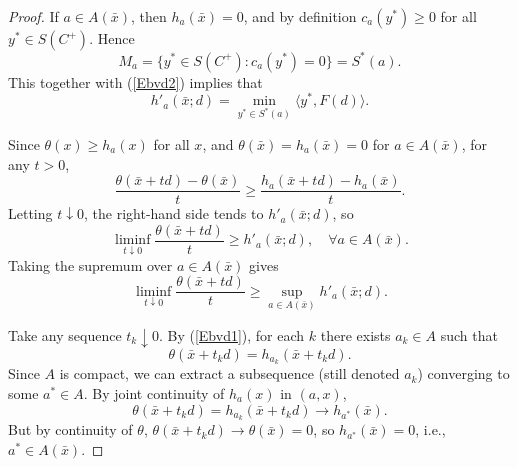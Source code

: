 \documentclass[11pt]{article}
\begin{document}
\begin{proof}
If $a\in A(\bar x)$, then $h_a(\bar x)=0$, and by definition $c_a(y^*)\ge0$ for all $y^*\in S(C^+)$. Hence
\[
M_a=\{y^*\in S(C^+):c_a(y^*)=0\}=S^*(a).
\]
This together with  (\ref{Ebvd2})  implies that 
\begin{equation}\label{Ebvd3}
h'_a(\bar x;d)=\min_{y^*\in S^*(a)}\langle y^*,F(d)\rangle. 
 \end{equation}
	
Since $\theta(x)\ge h_a(x)$ for all $x$, and $\theta(\bar x)=h_a(\bar x)=0$ for $a\in A(\bar x)$, for any $t>0$,
	\[
	\frac{\theta(\bar x+td)-\theta(\bar x)}{t}
	\ge\frac{h_a(\bar x+td)-h_a(\bar x)}{t}.
	\]
	Letting $t\downarrow0$, the right-hand side tends to $h'_a(\bar x;d)$, so
	\[
	\liminf_{t\downarrow0}\frac{\theta(\bar x+td)}{t}\ge h'_a(\bar x;d),\quad\forall a\in A(\bar x).
	\]
	Taking the supremum over $a\in A(\bar x)$ gives
\begin{equation}\label{Ebvd4}
	\liminf_{t\downarrow0}\frac{\theta(\bar x+td)}{t}\ge\sup_{a\in A(\bar x)}h'_a(\bar x;d) .  
\end{equation}

		Take any sequence $t_k\downarrow0$. By (\ref{Ebvd1}), for each $k$ there exists $a_k\in A$ such that
\begin{equation}\label{Ebvd5}	
	\theta(\bar x+t_k d)=h_{a_k}(\bar x+t_k d).
\end{equation} 
	Since $A$ is compact, we can extract a subsequence (still denoted $a_k$) converging to some $a^*\in A$. By joint continuity of $h_a(x)$ in $(a,x)$,
	\[
	\theta(\bar x+t_k d)=h_{a_k}(\bar x+t_k d)\to h_{a^*}(\bar x).
	\]
	But by continuity of $\theta$, $\theta(\bar x+t_k d)\to\theta(\bar x)=0$, so $h_{a^*}(\bar x)=0$, i.e., $a^*\in A(\bar x)$.
	

\end{proof}
\end{document}
